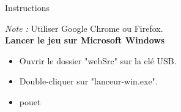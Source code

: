 \documentclass[10pt,a4paper]{article}
\begin{document}
\begin{center}
\begin{Huge}
Instructions 
\end{Huge}
\end{center}
\vspace{10pt}
\textit{Note :} Utiliser Google Chrome ou Firefox.\\

\textbf{Lancer le jeu sur Microsoft Windows }
\begin{itemize}
\item Ouvrir le dossier "webSrc" sur la clé USB.
\item Double-cliquer sur "lanceur-win.exe".
\item pouet
\end{itemize}
\end{document}

